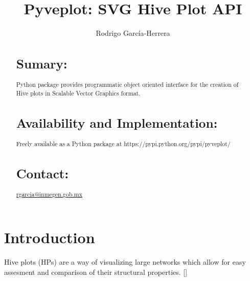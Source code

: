\documentclass{bioinfo}
\begin{document}

\title[short Title]{Pyveplot: SVG Hive Plot API}
\author[]{Rodrigo Garc\'ia-Herrera}
\address{Department of Bioinformatics, National Institute of Genomic
  Medicine, Periferico Sur 4809, Mexico City 14610}



\maketitle

\begin{abstract}

\section{Sumary:}
Python package provides programmatic object oriented interface for the
creation of Hive plots in Scalable Vector Graphics format.
\section{Availability and Implementation:}
Freely available as a Python package at
https://pypi.python.org/pypi/pyveplot/

\section{Contact:} \href{rgarcia@inmegen.gob.mx}{rgarcia@inmegen.gob.mx}
\end{abstract}

\section{Introduction}

Hive plots (HPs) are a way of visualizing large networks which allow
for easy assesment and comparison of their structural properties.
[\cite{krzywinski2012hive}]



\end{document}
